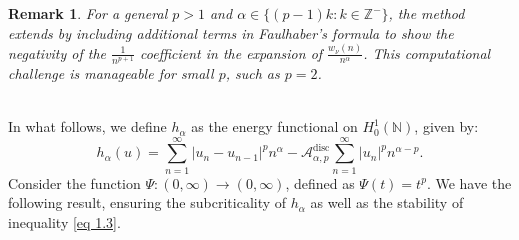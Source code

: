 \documentclass[11pt]{amsart}
\newtheorem{remark}[thm]{Remark}
\newcommand{\1}{[1]}
\begin{document}
\begin{remark} For a general $p > 1$ and $\alpha \in \{ (p-1)k : k \in \mathbb{Z}^{-} \}$, the method extends by including additional terms in Faulhaber's formula to show the negativity of the $\frac{1}{n^{p+1}}$ coefficient in the expansion of $\frac{w_\nu(n)}{n^\alpha}$. This computational challenge is manageable for small $p$, such as $p = 2$.
\end{remark}
\phantom{.} \\ 
In what follows, we define $h_{\alpha}$ as the energy functional on $H_{0}^{1}(\mathbb{N})$, given by:  
$$ h_{\alpha}(u) = \sum_{n=1}^{\infty} |u_n - u_{n-1}|^p n^{\alpha} - \mathcal{A}_{\alpha,p}^{\text{disc}} \sum_{n=1}^{\infty} |u_{n}|^p n^{\alpha-p}.  
$$ 
Consider the function $\Psi : (0, \infty) \to (0, \infty)$, defined as $\Psi(t) = t^p$. We have the following result, ensuring the subcriticality of $h_{\alpha}$ as well as the stability of inequality \eqref{eq 1.3}.
\end{document}
